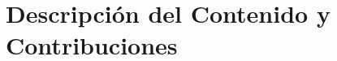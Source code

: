 
% 









































\section{Descripción del Contenido y Contribuciones}


